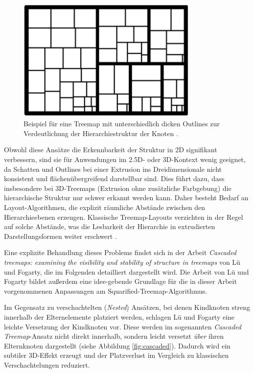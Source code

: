 \begin{figure}
    \centering
    \includegraphics[width=0.8\textwidth]{images/lineThickness2.png}
    \caption{Beispiel für eine Treemap mit unterschiedlich dicken Outlines zur Verdeutlichung der Hierarchiestruktur der Knoten \cite[1]{2010-perception-treemaps}.}
    \label{fig:thickOutline}
\end{figure}

Obwohl diese Ansätze die Erkennbarkeit der Struktur in 2D signifikant verbessern, sind sie für Anwendungen im 2.5D- oder 3D-Kontext wenig geeignet, da Schatten und Outlines bei einer Extrusion ins Dreidimensionale nicht konsistent und flächenübergreifend darstellbar sind. Dies führt dazu, dass insbesondere bei 3D-Treemaps (Extrusion ohne zusätzliche Farbgebung) die hierarchische Struktur nur schwer erkannt werden kann. Daher besteht Bedarf an Layout-Algorithmen, die explizit räumliche Abstände zwischen den Hierarchieebenen erzeugen. Klassische Treemap-Layouts verzichten in der Regel auf solche Abstände, was die Lesbarkeit der Hierarchie in extrudierten Darstellungsformen weiter erschwert \cite{wood2008spatially, shneiderman2001ordered, hu2014squarified}.

Eine explizite Behandlung dieses Problems findet sich in der Arbeit \textit{Cascaded treemaps: examining the visibility and stability of structure in treemaps} \cite{lu2008cascaded} von Lü und Fogarty, die im Folgenden detailliert dargestellt wird. Die Arbeit von Lü und Fogarty bildet außerdem eine idee-gebende Grundlage für die in dieser Arbeit vorgenommenen Anpassungen am Squarified-Treemap-Algorithmus.

Im Gegensatz zu verschachtelten (\textit{Nested}) Ansätzen, bei denen Kindknoten streng innerhalb der Elternelemente platziert werden, schlagen Lü und Fogarty eine leichte Versetzung der Kindknoten vor. Diese werden im sogenannten \textit{Cascaded Treemap}-Ansatz nicht direkt innerhalb, sondern leicht versetzt \textit{über} ihren Elternknoten dargestellt (siehe Abbildung \ref{fig:cascaded}). Dadurch wird ein subtiler 3D-Effekt erzeugt und der Platzverlust im Vergleich zu klassischen Verschachtelungen reduziert.

